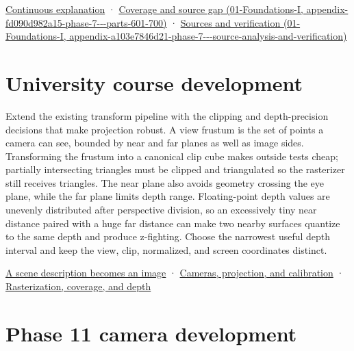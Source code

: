 \href{Continuous\%20Notes/Computing\%20Foundations\%20-\%20From\%20Bits\%20to\%20C++\%20and\%20Systems\%20APIs\#Keep\%20the\%20promises\%20visible\%20while\%20moving\%20between\%20representations}{Continuous explanation} · \href{../01-Foundations-I/main.pdf\#nameddest=appendix-fd090d982a15-phase-7---parts-601-700}{Coverage and source gap (01-Foundations-I, appendix-fd090d982a15-phase-7-\/-\/-parts-601-700)} · \href{../01-Foundations-I/main.pdf\#nameddest=appendix-a103e7846d21-phase-7---source-analysis-and-verification}{Sources and verification (01-Foundations-I, appendix-a103e7846d21-phase-7-\/-\/-source-analysis-and-verification)}

\section{University course development}\label{appendix-1c07d64f5e70-university-course-development}

Extend the existing transform pipeline with the clipping and depth-precision decisions that make projection robust. A view frustum is the set of points a camera can see, bounded by near and far planes as well as image sides. Transforming the frustum into a canonical clip cube makes outside tests cheap; partially intersecting triangles must be clipped and triangulated so the rasterizer still receives triangles. The near plane also avoids geometry crossing the eye plane, while the far plane limits depth range. Floating-point depth values are unevenly distributed after perspective division, so an excessively tiny near distance paired with a huge far distance can make two nearby surfaces quantize to the same depth and produce z-fighting. Choose the narrowest useful depth interval and keep the view, clip, normalized, and screen coordinates distinct.

\href{Continuous\%20Notes/University\%20-\%20Worlds,\%20Images\%20and\%20Inference\%20-\%20Graphics,\%20Vision\%20and\%20Photography\#A\%20scene\%20description\%20becomes\%20an\%20image}{A scene description becomes an image} · \href{Continuous\%20Notes/University\%20-\%20Worlds,\%20Images\%20and\%20Inference\%20-\%20Graphics,\%20Vision\%20and\%20Photography\#Cameras,\%20projection,\%20and\%20calibration}{Cameras, projection, and calibration} · \href{Continuous\%20Notes/University\%20-\%20Worlds,\%20Images\%20and\%20Inference\%20-\%20Graphics,\%20Vision\%20and\%20Photography\#Rasterization,\%20coverage,\%20and\%20depth}{Rasterization, coverage, and depth}

\section{Phase 11 camera development}\label{appendix-1c07d64f5e70-phase-11-camera-development}

